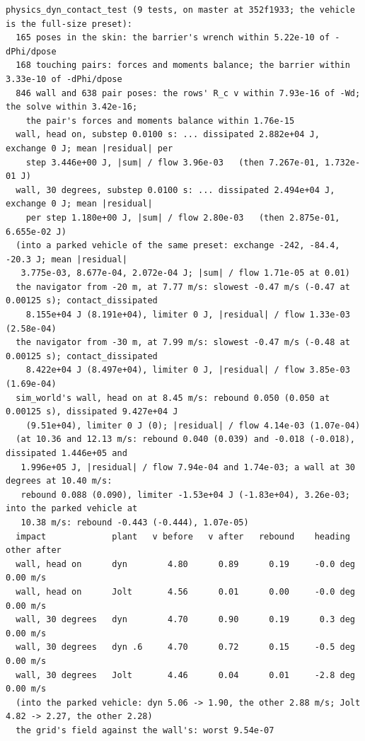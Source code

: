 \documentclass[11pt]{article}
\theoremstyle{remark}
\begin{document}
\begin{center}
\begin{minipage}{0.98\linewidth}
\scriptsize
\begin{verbatim}
physics_dyn_contact_test (9 tests, on master at 352f1933; the vehicle is the full-size preset):
  165 poses in the skin: the barrier's wrench within 5.22e-10 of -dPhi/dpose
  168 touching pairs: forces and moments balance; the barrier within 3.33e-10 of -dPhi/dpose
  846 wall and 638 pair poses: the rows' R_c v within 7.93e-16 of -Wd; the solve within 3.42e-16;
    the pair's forces and moments balance within 1.76e-15
  wall, head on, substep 0.0100 s: ... dissipated 2.882e+04 J, exchange 0 J; mean |residual| per
    step 3.446e+00 J, |sum| / flow 3.96e-03   (then 7.267e-01, 1.732e-01 J)
  wall, 30 degrees, substep 0.0100 s: ... dissipated 2.494e+04 J, exchange 0 J; mean |residual|
    per step 1.180e+00 J, |sum| / flow 2.80e-03   (then 2.875e-01, 6.655e-02 J)
  (into a parked vehicle of the same preset: exchange -242, -84.4, -20.3 J; mean |residual|
   3.775e-03, 8.677e-04, 2.072e-04 J; |sum| / flow 1.71e-05 at 0.01)
  the navigator from -20 m, at 7.77 m/s: slowest -0.47 m/s (-0.47 at 0.00125 s); contact_dissipated
    8.155e+04 J (8.191e+04), limiter 0 J, |residual| / flow 1.33e-03 (2.58e-04)
  the navigator from -30 m, at 7.99 m/s: slowest -0.47 m/s (-0.48 at 0.00125 s); contact_dissipated
    8.422e+04 J (8.497e+04), limiter 0 J, |residual| / flow 3.85e-03 (1.69e-04)
  sim_world's wall, head on at 8.45 m/s: rebound 0.050 (0.050 at 0.00125 s), dissipated 9.427e+04 J
    (9.51e+04), limiter 0 J (0); |residual| / flow 4.14e-03 (1.07e-04)
  (at 10.36 and 12.13 m/s: rebound 0.040 (0.039) and -0.018 (-0.018), dissipated 1.446e+05 and
   1.996e+05 J, |residual| / flow 7.94e-04 and 1.74e-03; a wall at 30 degrees at 10.40 m/s:
   rebound 0.088 (0.090), limiter -1.53e+04 J (-1.83e+04), 3.26e-03; into the parked vehicle at
   10.38 m/s: rebound -0.443 (-0.444), 1.07e-05)
  impact             plant   v before   v after   rebound    heading  other after
  wall, head on      dyn        4.80      0.89      0.19     -0.0 deg      0.00 m/s
  wall, head on      Jolt       4.56      0.01      0.00     -0.0 deg      0.00 m/s
  wall, 30 degrees   dyn        4.70      0.90      0.19      0.3 deg      0.00 m/s
  wall, 30 degrees   dyn .6     4.70      0.72      0.15     -0.5 deg      0.00 m/s
  wall, 30 degrees   Jolt       4.46      0.04      0.01     -2.8 deg      0.00 m/s
  (into the parked vehicle: dyn 5.06 -> 1.90, the other 2.88 m/s; Jolt 4.82 -> 2.27, the other 2.28)
  the grid's field against the wall's: worst 9.54e-07

\end{verbatim}
\end{minipage}
\end{center}
\end{document}
